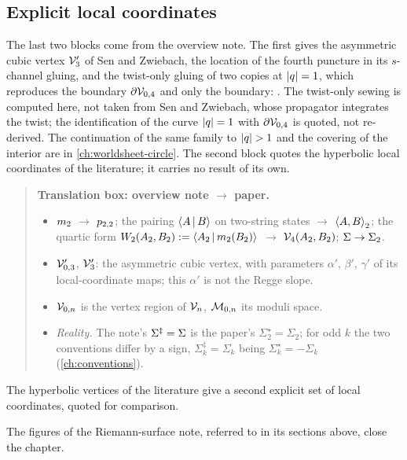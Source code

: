 \subsection{Explicit local coordinates}
\label{sec:ws1:explicit}

The last two blocks come from the overview note.
The first gives the asymmetric cubic vertex $\mc V_3'$ of Sen and Zwiebach, the location of the fourth puncture in its $s$-channel gluing, and the twist-only gluing of two copies at $\abs{q} = 1$, which reproduces the boundary $\partial \mc V_{0, 4}$ and only the boundary: .
The twist-only sewing is computed here, not taken from Sen and Zwiebach, whose propagator integrates the twist; the identification of the curve $\abs{q} = 1$ with $\partial \mc V_{0, 4}$ is quoted, not re-derived.
The continuation of the same family to $\abs{q} > 1$ and the covering of the interior are in \cref{ch:worldsheet-circle}.
The second block quotes the hyperbolic local coordinates of the literature; it carries no result of its own.

\begin{quote}
  \small
  \textbf{Translation box: overview note $\to$ paper.}
  \begin{itemize}
    \setlength{\itemsep}{0.3ex}
    \item $\mtwo$ $\to$ $\sprod{2}{2}$; the pairing $\Mean{A \,|\, B}$ on two-string states $\to$ $\pair[2]{A}{B}$; the quartic form $W_2(A_2, B_2) := \Mean{A_2 \,|\, \mtwo(B_2)}$ $\to$ $\vertex{4}(A_2, B_2)$; $\Sig \to \Sigma_2$.
    \item $\mc V_{0, 3}'$, $\mc V_3'$: the asymmetric cubic vertex, with parameters $\alpha'$, $\beta'$, $\gamma'$ of its local-coordinate maps; this $\alpha'$ is not the Regge slope.
    \item $\mc V_{0, n}$ is the vertex region of $\vertex{n}$, $\mc M_{0, n}$ its moduli space.
    \item \emph{Reality.} The note's $\Sig^\ddagger = \Sig$ is the paper's $\Sigma_2^\star = \Sigma_2$; for odd $k$ the two conventions differ by a sign, $\Sigma_k^\ddagger = \Sigma_k$ being $\Sigma_k^\star = - \Sigma_k$ (\cref{ch:conventions}).
  \end{itemize}
\end{quote}



The hyperbolic vertices of the literature give a second explicit set of local coordinates, quoted for comparison.



The figures of the Riemann-surface note, referred to in its sections above, close the chapter.


